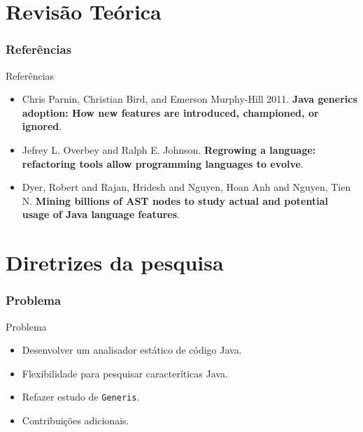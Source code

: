 \documentclass[]{beamer}
\begin{document}
	\section{Revisão Teórica}
	\frametitle{Referências}
	\begin{frame}[label=referencias]
		\begin{block}{Referências}
			\begin{itemize}
				\item Chris Parnin, Christian Bird, and Emerson Murphy-Hill 2011. \textbf{Java generics adoption: How new features are introduced, championed, or ignored}.
				
				\item Jefrey L. Overbey and Ralph E. Johnson. \textbf{Regrowing a language: refactoring tools
				allow programming languages to evolve}.
				
				\item Dyer, Robert and Rajan, Hridesh and Nguyen, Hoan Anh and Nguyen, Tien N. \textbf{Mining billions of AST nodes to study actual and potential usage of Java language features}.
			\end{itemize}
			
		\end{block}
	\end{frame}
	




	\section{Diretrizes da pesquisa}

	\begin{frame}[fragile]\frametitle{Problema}
		\begin{block}{Problema}
			\begin{itemize}
				\item Desenvolver um analisador estático de código Java.
			
				\item Flexibilidade para pesquisar caracteríticas Java.
			
				\item Refazer estudo de \texttt{Generis}.
				
				\item Contribuições adicionais.
			\end{itemize}
		\end{block}
	\end{frame}	
	
\end{document}
